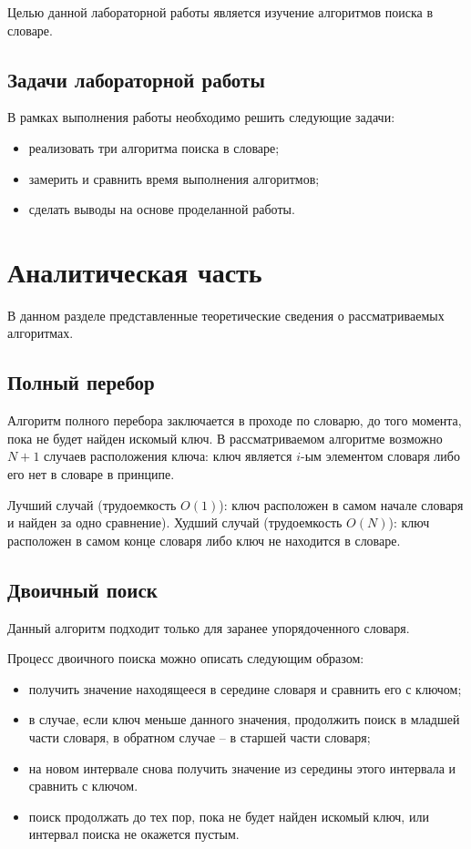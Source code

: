 \documentclass[12pt]{report}
\begin{document}
Целью данной лабораторной работы является изучение алгоритмов поиска в словаре.
	
\section*{Задачи лабораторной работы}
	
В рамках выполнения работы необходимо решить следующие задачи:
	
\begin{itemize}
	\item реализовать три алгоритма поиска в словаре;
	\item замерить и сравнить время выполнения алгоритмов;
	\item сделать выводы на основе проделанной работы.
\end{itemize}
	
\chapter{Аналитическая часть}
	
В данном разделе представленные теоретические сведения о рассматриваемых алгоритмах.
	
\section{Полный перебор}
	
Алгоритм полного перебора заключается в проходе по словарю, до того момента, пока не будет найден искомый ключ. В рассматриваемом алгоритме возможно $N + 1$ случаев расположения ключа: ключ является $i$-ым элементом словаря либо его нет в словаре в принципе. 
	
Лучший случай (трудоемкость $O(1)$): ключ расположен в самом начале словаря и найден за одно сравнение). Худший случай (трудоемкость $O(N)$): ключ расположен в самом конце словаря либо ключ не находится в словаре.
	
\section{Двоичный поиск}
	
Данный алгоритм подходит только для заранее упорядоченного словаря.
	
Процесс двоичного поиска можно описать следующим образом: 
	
\begin{itemize}
	\item получить значение находящееся в середине словаря и сравнить его с ключом;
	\item в случае, если ключ меньше данного значения, продолжить поиск в младшей части словаря, в обратном случае -- в старшей части словаря;
	\item на новом интервале снова получить значение из середины этого интервала и сравнить с ключом.
	\item поиск продолжать до тех пор, пока не будет найден искомый ключ, или интервал поиска не окажется пустым.
\end{itemize}
	
\end{document}

